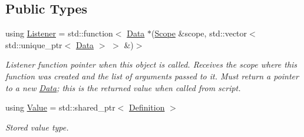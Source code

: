 \subsection*{Public Types}
\begin{DoxyCompactItemize}
\item 
using \hyperlink{classcreek_1_1_c_function_a9499b5501ecc59d9ef8d892991c8fa16}{Listener} = std\+::function$<$ \hyperlink{classcreek_1_1_data}{Data} $\ast$(\hyperlink{classcreek_1_1_scope}{Scope} \&scope, std\+::vector$<$ std\+::unique\+\_\+ptr$<$ \hyperlink{classcreek_1_1_data}{Data} $>$ $>$ \&)$>$\hypertarget{classcreek_1_1_c_function_a9499b5501ecc59d9ef8d892991c8fa16}{}\label{classcreek_1_1_c_function_a9499b5501ecc59d9ef8d892991c8fa16}

\begin{DoxyCompactList}\small\item\em Listener function pointer when this object is called. Receives the scope where this function was created and the list of arguments passed to it. Must return a pointer to a new {\ttfamily \hyperlink{classcreek_1_1_data}{Data}}; this is the returned value when called from script. \end{DoxyCompactList}\item 
using \hyperlink{classcreek_1_1_c_function_a6876be117b9faafce547d61b2e831131}{Value} = std\+::shared\+\_\+ptr$<$ \hyperlink{structcreek_1_1_c_function_1_1_definition}{Definition} $>$\hypertarget{classcreek_1_1_c_function_a6876be117b9faafce547d61b2e831131}{}\label{classcreek_1_1_c_function_a6876be117b9faafce547d61b2e831131}

\begin{DoxyCompactList}\small\item\em Stored value type. \end{DoxyCompactList}\end{DoxyCompactItemize}
